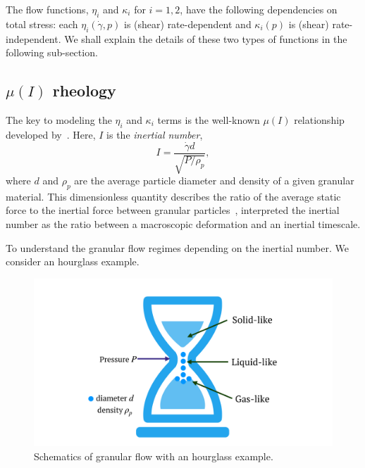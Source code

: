 

\par
The flow functions, $\eta_i$ and $\kappa_i$ for $i = 1,2$, have the following dependencies on total stress: each $\eta_i(\dot{\gamma}, p)$ is (shear) rate-dependent and $\kappa_i (p)$ is (shear) rate-independent. 
We shall explain the details of these two types of functions in the following sub-section.

\subsection{$\mu (I)$ rheology}
The key to modeling the $\eta_i$ and $\kappa_i$ terms is the well-known $\mu(I)$ relationship developed by~\cite{jop_constitutive_2006}.
Here, $I$ is the \textit{inertial number},
\begin{equation}
  I =  \frac{\dot{\gamma} d }{\sqrt{P/\rho_p}},
  \label{eq_inertialI}
\end{equation}
where $d$ and $\rho_p$ are the average particle diameter and density of a given granular material.
This dimensionless quantity describes the ratio of the average static force to the inertial force between granular particles~\cite{jop_constitutive_2006}, interpreted the inertial number as the ratio between a macroscopic deformation and an inertial timescale. 
\par
To understand the granular flow regimes depending on the inertial number. We consider an hourglass example. 
\begin{figure}[ht]
  \begin{center}
    \includegraphics[scale=0.15]{figures/fig_hourglass.pdf}
    \end{center}
  \caption{Schematics of granular flow with an hourglass example.}
  \label{fig_hourglass}
\end{figure}
